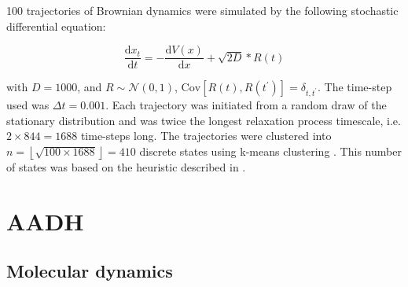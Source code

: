 100 trajectories of Brownian dynamics were simulated by the following stochastic differential equation: 

\begin{equation}\label{eqn:prinz_dynamics}
    \frac{\mathrm{d}x_t}{\mathrm{d}t} = -\frac{\mathrm{d}V(x)}{\mathrm{d}x} + \sqrt{2D} * R(t)
\end{equation}

with $D = 1000$, and $R\sim \mathcal{N}(0, 1)$, $\mathrm{Cov}\left[R(t), R(t^{\prime})\right]=\delta_{t, t^{\prime}}$. The time-step used was $\Delta t = 0.001$.  Each trajectory was initiated from a random draw of the stationary distribution and was twice the longest relaxation process timescale, i.e. $2\times 844=1688$ time-steps long. The trajectories were clustered into $n = \left\lfloor\sqrt{100\times 1688}\right\rfloor =410$ discrete states using k-means clustering \cite{friedman2001elements}. This number of states was based on the heuristic described in \cite{husicWardClusteringImproves2017a}.


\chapter{AADH}\label{app:aadh}
\section{Molecular dynamics}

